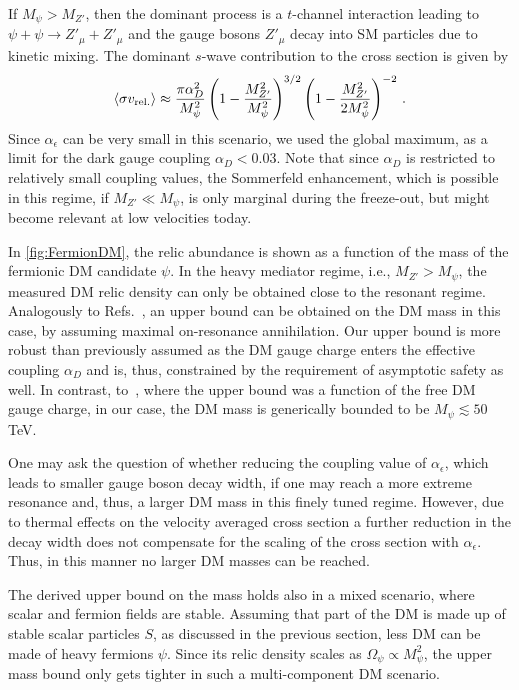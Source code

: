 \documentclass[aps,prd,twocolumn,preprintnumbers,superscriptaddress,nobibnotes,floatfix,longbibliography]{revtex4-1}
\begin{document}
If $M_\psi > M_{Z'}$, then the dominant process is a $t$-channel interaction leading to $\psi + \psi \rightarrow Z'_\mu + Z'_\mu$ and the gauge bosons $Z'_\mu$ decay into SM particles due to kinetic mixing.  The dominant $s$-wave contribution to the cross section is given by
\begin{align}
\langle \sigma v_{\rm rel.} \rangle \approx \frac{ \pi \alpha_D^2}{M_\psi^2}  \left( 1 - \frac{M_{Z'}^2}{M_\psi^2}\right)^{3/2} \left( 1 - \frac{M_{Z'}^2}{2 M_\psi^2}\right)^{-2}\,.
\end{align}
Since $\alpha_\epsilon$ can be very small in this scenario, we used the global maximum, as a limit for the dark gauge coupling $\alpha_D < 0.03$. Note that since $\alpha_D$ is restricted to relatively small coupling values, the Sommerfeld enhancement, which is possible in this regime, if $M_{Z'} \ll M_\psi$, is only marginal during the freeze-out, but might become relevant at low velocities today. 

In \autoref{fig:FermionDM}, the relic abundance is shown as a function of the mass of the fermionic DM candidate $\psi$. In the heavy mediator regime, i.e., $M_{Z'} > M_\psi$, the measured DM relic density can only be obtained close to the resonant regime. Analogously to Refs.~\cite{1409.8165, 1506.05107, 1803.07462, 1810.06646}, an upper bound can be obtained on the DM mass in this case, by assuming maximal on-resonance annihilation. Our upper bound is more robust than previously assumed as the DM gauge charge enters the effective coupling $\alpha_D$ and is, thus, constrained by the requirement of asymptotic safety as well. In contrast, to~\cite{1506.05107}, where the upper bound was a function of the free DM gauge charge, in our case, the DM mass is generically bounded to be $M_\psi \lesssim 50$\,TeV. 

One may ask the question of whether reducing the coupling value of $\alpha_\epsilon$, which leads to smaller gauge boson decay width, if one may reach a more extreme resonance and, thus, a larger DM mass in this finely tuned regime. However, due to thermal effects on the velocity averaged cross section a further reduction in the decay width does not compensate for the scaling of the cross section with $\alpha_\epsilon$. Thus, in this manner no larger DM masses can be reached. 

The derived upper bound on the mass holds also in a mixed scenario, where scalar and fermion fields are stable. Assuming that part of the DM is made up of stable scalar particles $S$, as discussed in the previous section, less DM can be made of heavy fermions $\psi$. Since its relic density scales as $\Omega_\psi \propto M_\psi^2$, the upper mass bound only gets tighter in such a multi-component DM scenario.  
\end{document}
